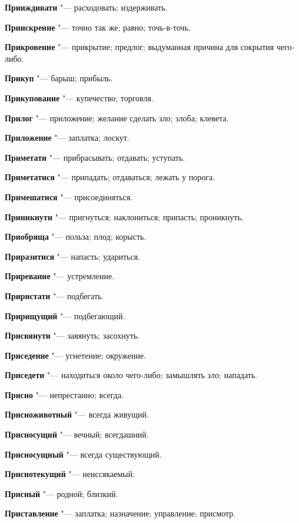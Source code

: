 \begin{mymulticols}
\noindent\textbf{Прииждивати} "--- расходовать; издерживать. 

\noindent\textbf{Приискренне} "--- точно так же; равно; точь-в-точь. 

\noindent\textbf{Прикровение} "--- прикрытие; предлог; выдуманная причина для сокрытия чего-либо. 

\noindent\textbf{Прикуп} "--- барыш; прибыль. 

\noindent\textbf{Прикупование} "--- купечество; торговля. 

\noindent\textbf{Прилог} "--- приложение; желание сделать зло; злоба; клевета. 

\noindent\textbf{Приложение} "--- заплатка; лоскут. 

\noindent\textbf{Приметати} "--- прибрасывать; отдавать; уступать. 

\noindent\textbf{Приметатися} "--- припадать; отдаваться; лежать у порога. 

\noindent\textbf{Примешатися} "--- присоединяться. 

\noindent\textbf{Приникнути} "--- пригнуться; наклониться; припасть; проникнуть. 

\noindent\textbf{Приобряща} "--- польза; плод; корысть. 

\noindent\textbf{Приразитися} "--- напасть; удариться. 

\noindent\textbf{Приревание} "--- устремление. 

\noindent\textbf{Приристати} "--- подбегать. 

\noindent\textbf{Пририщущий} "--- подбегающий. 

\noindent\textbf{Присвянути} "--- завянуть; засохнуть. 

\noindent\textbf{Приседение} "--- угнетение; окружение. 

\noindent\textbf{Приседети} "--- находиться около чего-либо; замышлять зло; нападать. 

\noindent\textbf{Присно} "--- непрестанно; всегда. 

\noindent\textbf{Присноживотный} "--- всегда живущий. 

\noindent\textbf{Присносущий} "--- вечный; всегдашний. 

\noindent\textbf{Присносущный} "--- всегда существующий. 

\noindent\textbf{Приснотекущий} "--- неиссякаемый. 

\noindent\textbf{Присный} "--- родной; близкий. 

\noindent\textbf{Приставление} "--- заплатка; назначение; управление; присмотр. 


\end{mymulticols}
